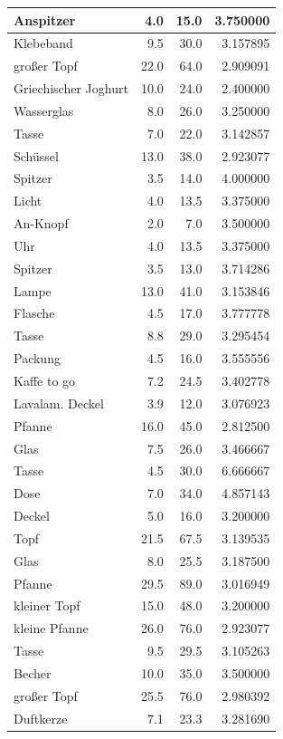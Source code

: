 \documentclass[
  ngerman,
]{book}
\begin{document}
\begin{table}[H]
\begin{tabular}[t]{l|r|r|r}
\hline
Anspitzer & 4.0 & 15.0 & 3.750000\\
\hline
Klebeband & 9.5 & 30.0 & 3.157895\\
\hline
großer Topf & 22.0 & 64.0 & 2.909091\\
\hline
Griechischer Joghurt & 10.0 & 24.0 & 2.400000\\
\hline
Wasserglas & 8.0 & 26.0 & 3.250000\\
\hline
Tasse & 7.0 & 22.0 & 3.142857\\
\hline
Schüssel & 13.0 & 38.0 & 2.923077\\
\hline
Spitzer & 3.5 & 14.0 & 4.000000\\
\hline
Licht & 4.0 & 13.5 & 3.375000\\
\hline
An-Knopf & 2.0 & 7.0 & 3.500000\\
\hline
Uhr & 4.0 & 13.5 & 3.375000\\
\hline
Spitzer & 3.5 & 13.0 & 3.714286\\
\hline
Lampe & 13.0 & 41.0 & 3.153846\\
\hline
Flasche & 4.5 & 17.0 & 3.777778\\
\hline
Tasse & 8.8 & 29.0 & 3.295454\\
\hline
Packung & 4.5 & 16.0 & 3.555556\\
\hline
Kaffe to go & 7.2 & 24.5 & 3.402778\\
\hline
Lavalam. Deckel & 3.9 & 12.0 & 3.076923\\
\hline
Pfanne & 16.0 & 45.0 & 2.812500\\
\hline
Glas & 7.5 & 26.0 & 3.466667\\
\hline
Tasse & 4.5 & 30.0 & 6.666667\\
\hline
Dose & 7.0 & 34.0 & 4.857143\\
\hline
Deckel & 5.0 & 16.0 & 3.200000\\
\hline
Topf & 21.5 & 67.5 & 3.139535\\
\hline
Glas & 8.0 & 25.5 & 3.187500\\
\hline
Pfanne & 29.5 & 89.0 & 3.016949\\
\hline
kleiner Topf & 15.0 & 48.0 & 3.200000\\
\hline
kleine Pfanne & 26.0 & 76.0 & 2.923077\\
\hline
Tasse & 9.5 & 29.5 & 3.105263\\
\hline
Becher & 10.0 & 35.0 & 3.500000\\
\hline
großer Topf & 25.5 & 76.0 & 2.980392\\
\hline
Duftkerze & 7.1 & 23.3 & 3.281690\\

\end{tabular}
\end{table}
\end{document}
